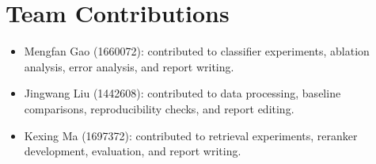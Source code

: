 \documentclass[11pt]{article}
\begin{document}
\section*{Team Contributions}

\begin{itemize}
  \item Mengfan Gao (1660072): contributed to classifier experiments, ablation analysis, error analysis, and report writing.
  \item Jingwang Liu (1442608): contributed to data processing, baseline comparisons, reproducibility checks, and report editing.
  \item Kexing Ma (1697372): contributed to retrieval experiments, reranker development, evaluation, and report writing.
\end{itemize}



\end{document}
